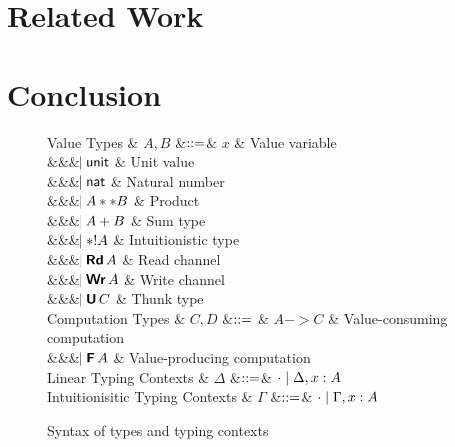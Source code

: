 \documentclass{llncs}
\begin{document}
\begin{ilc}[COM]

\end{ilc}
    

\section{Related Work}

\section{Conclusion}




\appendix

\begin{figure}[htbp]
  \centering

\begin{grammar}
  Value Types
  & $A,B$
      &$\mathrel{::=}$&
      $x$ & Value variable
      \\ &&& $\hspace{-1.02ex}\mathrel{\mid} \mathsf{unit}$ & Unit value
      \\ &&& $\hspace{-1.02ex}\mathrel{\mid} \mathsf{nat}$         & Natural number
      \\ &&& $\hspace{-1.02ex}\mathrel{\mid} A ** B$ & Product
      \\ &&& $\hspace{-1.02ex}\mathrel{\mid} A + B$ & Sum type
      \\ &&& $\hspace{-1.02ex}\mathrel{\mid} *! A$ & Intuitionistic type
      \\ &&& $\bnfaltbrk \tyRd{A}$ & Read channel
      \\ &&& $\bnfaltbrk \tyWr{A}$ & Write channel
      \\ &&& $\bnfaltbrk \tyU{C}$ & Thunk type
  \\[1ex]
  Computation Types
  & $C, D$
      &$\mathrel{::=}$ & 
             $A -> C$ & Value-consuming computation
      \\ &&& $\bnfaltbrk \tyF{A}$ & Value-producing computation
  \\[1ex]
  Linear Typing Contexts
  & $\Delta$
     &$\mathrel{::=}$& $\cdot \mathrel{\mid} \Delta,x:A$
  \\
  Intuitionisitic Typing Contexts
  & $\Gamma$
     &$\mathrel{::=}$& $\cdot \mathrel{\mid} \Gamma,x:A$
\end{grammar}

  \caption{Syntax of types and typing contexts}
  \label{fig:expr}
\end{figure}
\end{document}
